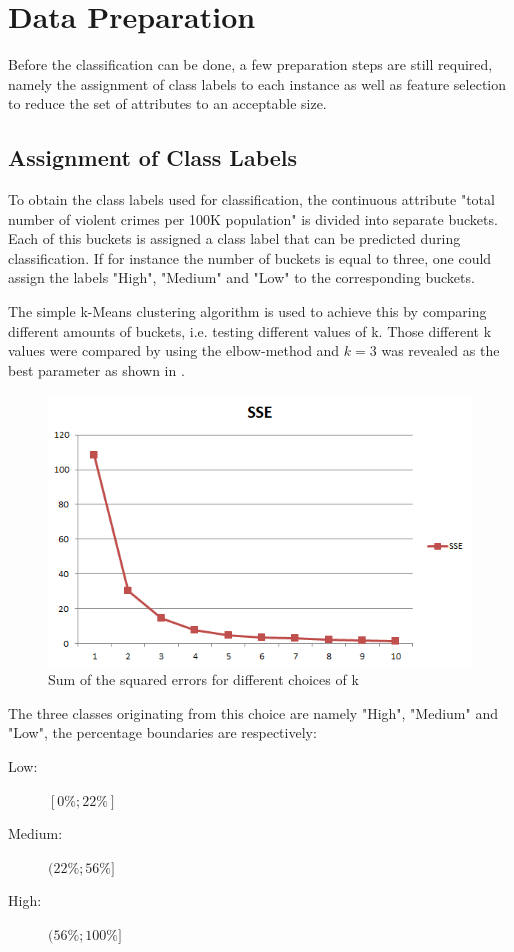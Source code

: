 \section{Data Preparation}

Before the classification can be done, a few preparation steps are still
required, namely the assignment of class labels to each instance as
well as feature selection to reduce the set of attributes to an
acceptable size.

\subsection{Assignment of Class Labels}

To obtain the class labels used for classification, the
continuous attribute "total number of violent crimes per 100K
population" is divided into separate buckets. Each of this buckets is
assigned a class label that can be predicted during classification.
If for instance the number of buckets is equal to three, one could
assign the labels "High", "Medium" and "Low" to the corresponding
buckets.

The simple k-Means clustering algorithm is used to achieve this
by comparing different amounts of buckets, i.e. testing
different values of k. Those different k values were compared by using
the elbow-method and \(k=3\) was revealed as the best parameter as
shown in .
\begin{figure}[H]
  \centering
  \includegraphics[width=\columnwidth]{../../charts/SSE.png}
  \caption{Sum of the squared errors for different choices of k}
  \label{fig:sse}
\end{figure}
The three classes originating from this choice are namely
"High", "Medium" and "Low", the percentage boundaries are
respectively:
\begin{description}
\item[Low:] \([0\%; 22\%]\) 
\item[Medium:] \((22\%; 56\%]\)
\item[High:] \((56\%; 100\%]\)
\end{description}

